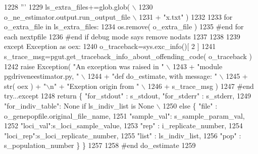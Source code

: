 \begin{DoxyCode}
1228 \textcolor{stringliteral}{            '''}
1229             ls\_extra\_files+=glob.glob( \(\backslash\)
1230                     o\_ne\_estimator.output.run\_output\_file \(\backslash\)
1231                     + \textcolor{stringliteral}{"x.txt"} )
1232 
1233             \textcolor{keywordflow}{for} o\_extra\_file \textcolor{keywordflow}{in} ls\_extra\_files:
1234                 os.remove( o\_extra\_file )
1235             \textcolor{comment}{#end for each nextpfile}
1236         \textcolor{comment}{#end if debug mode says remove nodats}
1237 
1238         
1239     \textcolor{keywordflow}{except} Exception \textcolor{keyword}{as} oex:
1240         o\_traceback=sys.exc\_info()[ 2 ]
1241         s\_trace\_msg=pgut.get\_traceback\_info\_about\_offending\_code( o\_traceback ) 
1242         \textcolor{keywordflow}{raise} Exception( \textcolor{stringliteral}{"An exception was raised in "} \(\backslash\)
1243                              + \textcolor{stringliteral}{"module pgdriveneestimator.py, "} \(\backslash\)
1244                              + \textcolor{stringliteral}{"def do\_estimate, with message: "} \(\backslash\)
1245                              + str( oex ) + \textcolor{stringliteral}{"\(\backslash\)n"} + \textcolor{stringliteral}{"Exeption origin from "} \(\backslash\)
1246                              + s\_trace\_msg )
1247     \textcolor{comment}{#end try...except}
1248     \textcolor{keywordflow}{return} \{ \textcolor{stringliteral}{"for\_stdout"} : s\_stdout, \textcolor{stringliteral}{"for\_stderr"} : s\_stderr, 
1249             \textcolor{stringliteral}{"for\_indiv\_table"}: \textcolor{keywordtype}{None} \textcolor{keywordflow}{if} ls\_indiv\_list \textcolor{keywordflow}{is} \textcolor{keywordtype}{None} \(\backslash\)
1250                     \textcolor{keywordflow}{else} \{ \textcolor{stringliteral}{"file"} : o\_genepopfile.original\_file\_name, 
1251                         \textcolor{stringliteral}{"sample\_val"}: s\_sample\_param\_val,
1252                         \textcolor{stringliteral}{"loci\_val"}:s\_loci\_sample\_value,
1253                         \textcolor{stringliteral}{"rep"} : i\_replicate\_number,
1254                         \textcolor{stringliteral}{"loci\_rep"}:s\_loci\_replicate\_number,
1255                         \textcolor{stringliteral}{"list"} : ls\_indiv\_list,
1256                         \textcolor{stringliteral}{"pop"} : s\_population\_number \} \}
1257 
1258 \textcolor{comment}{#end do\_estimate}
1259 
\end{DoxyCode}
